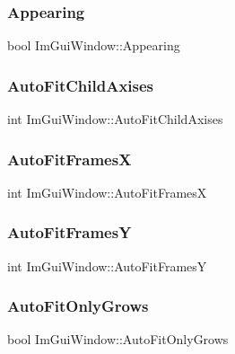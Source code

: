 \subsubsection{\texorpdfstring{Appearing}{Appearing}}
{\footnotesize\ttfamily bool Im\+Gui\+Window\+::\+Appearing}

\hypertarget{struct_im_gui_window_ad323df685c026a4557912a5090414abe}{}\label{struct_im_gui_window_ad323df685c026a4557912a5090414abe} 
\subsubsection{\texorpdfstring{Auto\+Fit\+Child\+Axises}{AutoFitChildAxises}}
{\footnotesize\ttfamily int Im\+Gui\+Window\+::\+Auto\+Fit\+Child\+Axises}

\hypertarget{struct_im_gui_window_a4ec83127718940ff4e0e268dc45232cf}{}\label{struct_im_gui_window_a4ec83127718940ff4e0e268dc45232cf} 
\subsubsection{\texorpdfstring{Auto\+Fit\+FramesX}{AutoFitFramesX}}
{\footnotesize\ttfamily int Im\+Gui\+Window\+::\+Auto\+Fit\+FramesX}

\hypertarget{struct_im_gui_window_a081b945f503a33c5fc686ff2ea9985f0}{}\label{struct_im_gui_window_a081b945f503a33c5fc686ff2ea9985f0} 
\subsubsection{\texorpdfstring{Auto\+Fit\+FramesY}{AutoFitFramesY}}
{\footnotesize\ttfamily int Im\+Gui\+Window\+::\+Auto\+Fit\+FramesY}

\hypertarget{struct_im_gui_window_a3583d20a57fea8c8491f14f2dcda483c}{}\label{struct_im_gui_window_a3583d20a57fea8c8491f14f2dcda483c} 
\subsubsection{\texorpdfstring{Auto\+Fit\+Only\+Grows}{AutoFitOnlyGrows}}
{\footnotesize\ttfamily bool Im\+Gui\+Window\+::\+Auto\+Fit\+Only\+Grows}

